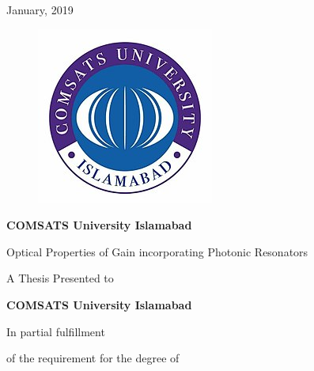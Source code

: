 \documentclass[12pt]{report}
\begin{document}
	\begin{center}
		 January, 2019
	\end{center}
	\newpage
	\noindent
	\begin{figure}
		\centering
		\includegraphics[width=0.8\linewidth]{university.jpg}
	\end{figure}
	\begin{center}
	{\Large{ \textbf{COMSATS University Islamabad}}}
	\end{center}
	
	\vspace{0.2 in}
	
	\begin{center}
		{\Large {Optical Properties of Gain incorporating Photonic Resonators
		} }
	\end{center}
	\vspace{0.5 in}
	
	\begin{center}
	{A Thesis Presented to}
	\end{center}
	\vspace{0.2 in}
	\begin{center}
		{\Large {\textbf{COMSATS University Islamabad}} }
	\end{center}
	\vspace{0.5 in}
	\begin{center}
		{In partial fulfillment }
	\end{center}

	\begin{center}
		{of the requirement for the degree of}
	\end{center}
	
\end{document}
